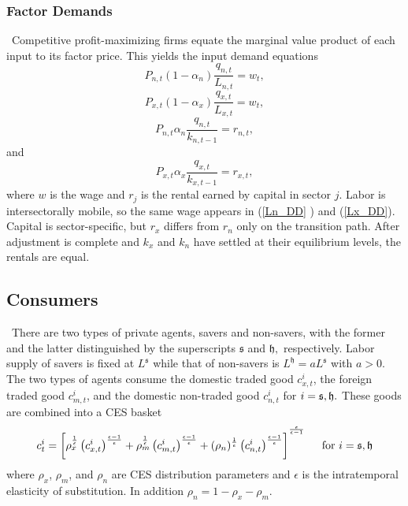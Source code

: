 \documentclass[11pt]{article}
\begin{document}
\subsubsection{Factor Demands}

\quad\ \thinspace Competitive profit-maximizing firms equate the marginal
value product of each input to its factor price. This yields the input
demand equations 
\begin{equation}
P_{n,t}(1-\alpha _{n})\frac{q_{n,t}}{L_{n,t}}=w_{t},  \label{Ln_DD}
\end{equation}%
\begin{equation}
P_{x,t}(1-\alpha _{x})\frac{q_{x,t}}{L_{x,t}}=w_{t},  \label{Lx_DD}
\end{equation}%
\begin{equation}
P_{n,t}\alpha _{n}\frac{q_{n,t}}{k_{n,t-1}}=r_{n,t},  \label{Kn_DD}
\end{equation}%
and%
\begin{equation}
P_{x,t}\alpha _{x}\frac{q_{x,t}}{k_{x,t-1}}=r_{x,t},  \label{Kx_DD}
\end{equation}%
where $w$ is the wage and $r_{j}$ is the rental earned by capital in sector $%
j$. Labor is intersectorally mobile, so the same wage appears in (\ref{Ln_DD}%
) and (\ref{Lx_DD}). Capital is sector-specific, but $r_{x}$ differs from $%
r_{n}$ only on the transition path. After adjustment is complete and $k_{x}$
and $k_{n}$ have settled at their equilibrium levels, the rentals are equal.

\subsection{Consumers}

\quad\ \thinspace There are two types of private agents, savers and
non-savers, with the former and the latter distinguished by the superscripts 
$\mathfrak{s}$ and $\mathfrak{h,}$ respectively. Labor supply of savers is
fixed at $L^{\mathfrak{s}}$ while that of non-savers is $L^{\mathfrak{h}%
}=aL^{\mathfrak{s}}$ with $a>0$. The two types of agents consume the
domestic traded good $c_{x,t}^{i}$, the foreign traded good $c_{m,t}^{i}$,
and the domestic non-traded good $c_{n,t}^{i}$ for $i=\mathfrak{s},\mathfrak{%
h}.$ These goods are combined into a CES basket%
\begin{equation}
c_{t}^{i}=\left[ \rho _{x}^{\frac{1}{\epsilon }}\left( c_{x,t}^{i}\right) ^{%
\frac{\epsilon -1}{\epsilon }}+\rho _{m}^{\frac{1}{\epsilon }}\left(
c_{m,t}^{i}\right) ^{\frac{\epsilon -1}{\epsilon }}+(\rho _{n})^{\frac{1}{%
\epsilon }}\left( c_{n,t}^{i}\right) ^{\frac{\epsilon -1}{\epsilon }}\right]
^{^{\frac{\epsilon }{\epsilon -1}}}\text{ \ \ \ for }i=\mathfrak{s},%
\mathfrak{h}  \label{c_basket}
\end{equation}%
where $\rho _{x}$, $\rho _{m}$, and $\rho _{n}$ are CES distribution
parameters and $\epsilon $ is the intratemporal elasticity of substitution.
In addition $\rho _{n}=1-\rho _{x}-\rho _{m}$.
\end{document}
